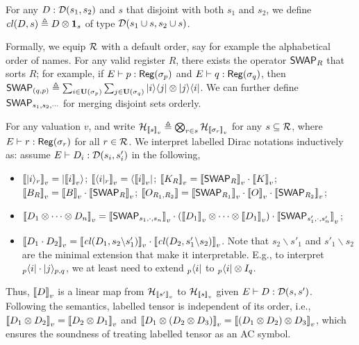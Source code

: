 \begin{definition}
  For any $D : {\mathcal{D}}(s_1,s_2)$ and $s$ that disjoint with both $s_1$ and $s_2$, we define ${\mathit{cl}}(D,s) \triangleq D\otimes \mathbf{1}_{s}$ of type ${\mathcal{D}}(s_1\cup s, s_2\cup s)$.
\end{definition}
Formally, we equip $\mathcal{R}$ with a default order, say for example the alphabetical order of names. For any valid register $R$, there exists the operator ${\mathsf{SWAP}}_R$ that sorts $R$; for example, if $E\vdash p : \mathsf{Reg}(\sigma_p)$ and $E\vdash q : \mathsf{Reg}(\sigma_q)$, then ${\mathsf{SWAP}}_{(q,p)} \triangleq \sum_{i\in \mathbf{U}(\sigma_p)}\sum_{j\in \mathbf{U}(\sigma_q)}|i\rangle\langle j|\otimes |j\rangle\langle i|$. We can further define ${\mathsf{SWAP}}_{s_1,s_2,\cdots}$ for merging disjoint sets orderly.

For any valuation $v$, and write ${\mathcal{H}}_{{\llbracket s \rrbracket}_v} \triangleq \bigotimes_{r\in s}{\mathcal{H}}_{{\llbracket \sigma_r \rrbracket}_v}$ for any $s\subseteq \mathcal{R}$, where $E\vdash r : \mathsf{Reg}(\sigma_r)$ for all $r\in\mathcal{R}$. We interpret labelled Dirac notations inductively as: assume $E\vdash D_i : {\mathcal{D}}(s_i,s'_i)$ in the following,
\begin{itemize}
  \item ${\llbracket |i\rangle_r \rrbracket}_v = |{\llbracket i \rrbracket}_v\rangle$;\quad 
        ${\llbracket \langle i|_r \rrbracket}_v = \langle{\llbracket i \rrbracket}_v|$;\quad  
        ${\llbracket K_R \rrbracket}_v = {\llbracket {\mathsf{SWAP}}_R \rrbracket}_v \cdot {\llbracket K \rrbracket}_v$; \\
        ${\llbracket B_R \rrbracket}_v = {\llbracket B \rrbracket}_v\cdot {\llbracket {\mathsf{SWAP}}_R \rrbracket}_v$;\quad
        ${\llbracket O_{R_1,R_2} \rrbracket} = {\llbracket {\mathsf{SWAP}}_{R_1} \rrbracket}_v\cdot {\llbracket O \rrbracket}_v\cdot {\llbracket {\mathsf{SWAP}}_{R_2} \rrbracket}_v$;
  \item ${\llbracket D_1\otimes \cdots \otimes D_n \rrbracket}_v = {\llbracket {\mathsf{SWAP}}_{s_1,\cdot,s_n} \rrbracket}_v\cdot ({\llbracket D_1 \rrbracket}_v\otimes \cdots \otimes {\llbracket D_1 \rrbracket}_v)\cdot {\llbracket {\mathsf{SWAP}}_{s'_1,\cdot,s'_n} \rrbracket}_v$;
  \item ${\llbracket D_1\cdot D_2 \rrbracket}_v = {\llbracket {\mathit{cl}}(D_1, s_2\backslash s'_1) \rrbracket}_v\cdot {\llbracket {\mathit{cl}}(D_2, s'_1\backslash s_2) \rrbracket}_v$. Note that $s_2\backslash s'_1$ and $s'_1\backslash s_2$ are the minimal extension that make it interpretable. E.g., to interpret ${}_p\langle i|\cdot |j\rangle_{p,q}$, we at least need to extend ${}_p\langle i|$ to ${}_p\langle i|\otimes I_{q}$.
\end{itemize}
Thus, ${\llbracket D \rrbracket}_v$ is a linear map from ${\mathcal{H}}_{{\llbracket s' \rrbracket}_v}$ to ${\mathcal{H}}_{{\llbracket s \rrbracket}_v}$ given $E\vdash D : {\mathcal{D}}(s,s')$. Following the semantics, labelled tensor is independent of its order, i.e., ${\llbracket D_1\otimes D_2 \rrbracket}_v = {\llbracket D_2\otimes D_1 \rrbracket}_v$ and ${\llbracket D_1\otimes (D_2\otimes D_3) \rrbracket}_v = {\llbracket (D_1\otimes D_2)\otimes D_3 \rrbracket}_v$, which ensures the soundness of treating labelled tensor as an AC symbol.

